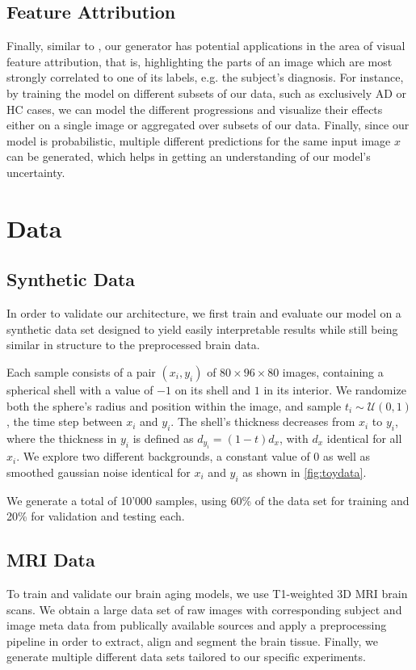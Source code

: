 \section{Feature Attribution}
Finally, similar to \cite{baumgartner2018visual}, our generator has potential applications in the area of visual feature attribution, that is, highlighting the parts of an image which are most strongly correlated to one of its labels, e.g. the subject's diagnosis.
For instance, by training the model on different subsets of our data, such as exclusively AD or HC cases, we can model the different progressions and visualize their effects either on a single image or aggregated over subsets of our data.
Finally, since our model is probabilistic, multiple different predictions for the same input image $x$ can be generated, which helps in getting an understanding of our model's uncertainty.

\chapter{Data}

\section{Synthetic Data}
\label{sec:datsynth}
In order to validate our architecture, we first train and evaluate our model on a synthetic data set designed to yield easily interpretable results while still being similar in structure to the preprocessed brain data.

Each sample consists of a pair $(x_i, y_i)$ of $ 80 \times 96 \times 80 $ images, containing a spherical shell with a value of $-1$ on its shell and $1$ in its interior. We randomize both the sphere's radius and position within the image, and sample $t_i \sim \mathcal{U}(0, 1)$, the time step between $x_i$ and $y_i$. The shell's thickness decreases from $x_i$ to $y_i$, where the thickness in $y_i$ is defined as $d_{y_i} = (1-t) d_x$, with $d_x$ identical for all $x_i$. We explore two different backgrounds, a constant value of 0 as well as smoothed gaussian noise identical for $x_i$ and $y_i$ as shown in \autoref{fig:toydata}.

We generate a total of 10'000 samples, using 60\% of the data set for training and 20\% for validation and testing each.

\section{MRI Data}
To train and validate our brain aging models, we use T1-weighted 3D MRI brain scans. We obtain a large data set of raw images with corresponding subject and image meta data from publically available sources and apply a preprocessing pipeline in order to extract, align and segment the brain tissue. Finally, we generate multiple different data sets tailored to our specific experiments.

